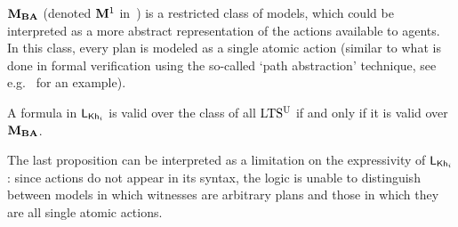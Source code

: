 \medskip 

$\mathbf{M}_{\mathbf{BA}}$ (denoted $\mathbf{M}^1$ in~\cite{AFSV22}) is a restricted class of models, which could be interpreted as a more abstract representation of the actions available to agents. In this class, every plan is modeled as a single atomic action (similar to what is done in formal verification using the so-called `path abstraction' technique, see e.g.~\cite{AbrahamJWKB10} for an example). 

\medskip	
	
\begin{proposition}
	A formula in $\mathsf{L}_{{\sf Kh}_i}$ is valid over the class of all $\textup{LTS$^\text{\textup{U}}$}$ if and only if 
	it is valid over $\mathbf{M}_{\mathbf{BA}}$.
\end{proposition}	
\medskip

The last proposition can be interpreted as a limitation on the expressivity of $\mathsf{L}_{{\sf Kh}_i}$: since actions do not appear in its syntax, the logic is unable to distinguish between models in which witnesses are arbitrary plans and those in which they are all single atomic actions.




